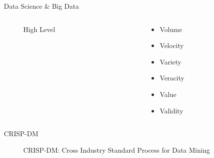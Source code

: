 
\begin{frame}{Data Science \& Big Data}
	\begin{columns}
		
		\begin{column}{0.75\textwidth}
			\begin{tcolorbox}[enhanced jigsaw, colback=white, opacityback=.4, colframe=ElixirPurple, arc=3mm, boxrule=0mm, height=0.8\textheight, valign=center, title=DS Perspective]
					\begin{figure}[htbp]
					\centering
					\resizebox{\columnwidth}{!}{}
					\caption{High Level}
				\end{figure}
			\end{tcolorbox}
		\end{column}
		
		\begin{column}{0.25\textwidth}
			\begin{tcolorbox}[enhanced jigsaw, colback=white, opacityback=.4, colframe=ElixirPurple, arc=3mm, boxrule=0mm, height=0.8\textheight, valign=center, title=Big Data]
				
				\begin{itemize}
					\item Volume
					\item Velocity
					\item Variety
					\vspace{3pt}
					\item Veracity
					\vspace{3pt}
					\item Value
					\item Validity
					
				\end{itemize}
				
			\end{tcolorbox}
		\end{column}
	\end{columns}
\end{frame}

\begin{frame}{CRISP-DM}
	\begin{figure}[htbp]
		\centering
		\resizebox{\columnwidth}{!}{}
		\caption{CRISP-DM: Cross Industry Standard Process for Data Mining}
	\end{figure}
\end{frame}